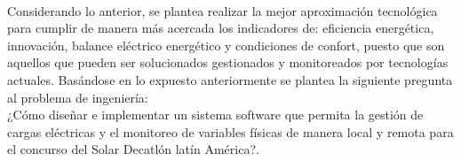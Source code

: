 \vspace{0.5cm}\\
Considerando lo anterior, se plantea realizar la mejor aproximación tecnológica para cumplir de manera más acercada los indicadores de: eficiencia energética, innovación, balance eléctrico energético y condiciones de confort, puesto que son aquellos que pueden ser solucionados gestionados y monitoreados por tecnologías actuales. Basándose en lo expuesto anteriormente se plantea la siguiente pregunta al problema de ingeniería:
\vspace{0.5cm}\\
¿Cómo diseñar e implementar un sistema software que permita la gestión de cargas eléctricas y el monitoreo de variables físicas de manera local y remota para el concurso del Solar Decatlón latín América?.